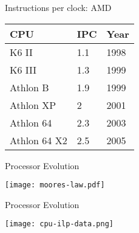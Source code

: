 \documentclass[english,compress]{beamer}
\begin{document}
\begin{frame}{Instructions per clock: AMD}
  \begin{center}
    \begin{tabular}{l|l|l}
      CPU & IPC & Year\\
      \hline
      K6 II          &1.1 & 1998\\
      K6 III         &1.3 & 1999\\
      Athlon B       &1.9 & 1999 \\
      Athlon XP      &2 & 2001 \\
      Athlon 64      &2.3 & 2003\\
      Athlon 64 X2   &2.5 & 2005\\
    \end{tabular}
  \end{center}
\end{frame}
\begin{frame}{Processor Evolution}
  \begin{center}
    \texttt{[image: moores-law.pdf]}
  \end{center}
\end{frame}
\begin{frame}{Processor Evolution}
  \begin{center}
    \texttt{[image: cpu-ilp-data.png]}
  \end{center}
\end{frame}
\end{document}
